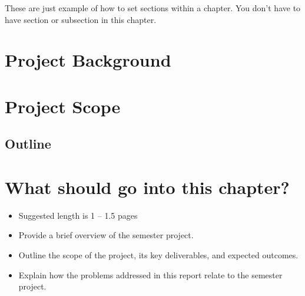 

These are just example of how to set sections within a chapter. You don't have to have section or subsection in this chapter.

\section{Project Background}
\label{sec:pb}

\section{Project Scope}
\label{sec:ps}

\subsection{Outline}
\label{ssec:outline}

\section{What should go into this chapter?}

\begin{itemize}

    \item [-] Suggested length is 1 – 1.5 pages
    \item [-] Provide a brief overview of the semester project.
    \item [-] Outline the scope of the project, its key deliverables, and expected outcomes.
    \item [-] Explain how the problems addressed in this report relate to the semester project.

\end{itemize}